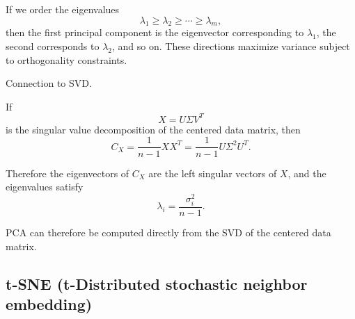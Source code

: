 \documentclass{article}
\begin{document}
\begin{enumerate}
If we order the eigenvalues
\[
\lambda_1 \ge \lambda_2 \ge \cdots \ge \lambda_m,
\]
then the first principal component is the eigenvector corresponding to $\lambda_1$, the second corresponds to $\lambda_2$, and so on. These directions maximize variance subject to orthogonality constraints.

Connection to SVD.

If
\[
X = U \Sigma V^T
\]
is the singular value decomposition of the centered data matrix, then
\[
C_X
=
\frac{1}{n-1} X X^T
=
\frac{1}{n-1} U \Sigma^2 U^T.
\]

Therefore the eigenvectors of $C_X$ are the left singular vectors of $X$, and the eigenvalues satisfy
\[
\lambda_i = \frac{\sigma_i^2}{n-1}.
\]

PCA can therefore be computed directly from the SVD of the centered data matrix.

\end{enumerate}

\subsection*{t-SNE (t-Distributed stochastic neighbor embedding)}
\end{document}
